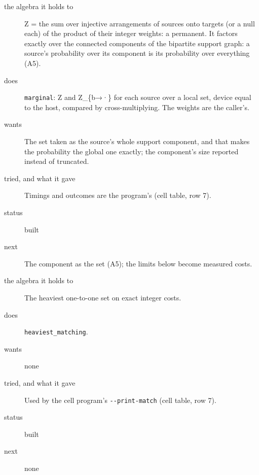 \begin{description}
\item[{the algebra it holds to}] Z = the sum over injective arrangements of sources onto targets (or a null each) of the product of their integer weights: a permanent. It factors exactly over the connected components of the bipartite support graph: a source's probability over its component is its probability over everything (A5).
\item[{does}] \texttt{marginal}: Z and Z\_\allowbreak{}\{b→·\} for each source over a local set, device equal to the host, compared by cross-multiplying. The weights are the caller's.
\item[{wants}] The set taken as the source's whole support component, and that makes the probability the global one exactly; the component's size reported instead of truncated.
\item[{tried, and what it gave}] Timings and outcomes are the program's (cell table, row 7).
\item[{status}] built
\item[{next}] The component as the set (A5); the limits below become measured costs.
\end{description}

\begin{description}
\item[{the algebra it holds to}] The heaviest one-to-one set on exact integer costs.
\item[{does}] \texttt{heaviest\_\allowbreak{}matching}.
\item[{wants}] none
\item[{tried, and what it gave}] Used by the cell program's \texttt{-\allowbreak{}-\allowbreak{}print-\allowbreak{}match} (cell table, row 7).
\item[{status}] built
\item[{next}] none
\end{description}

